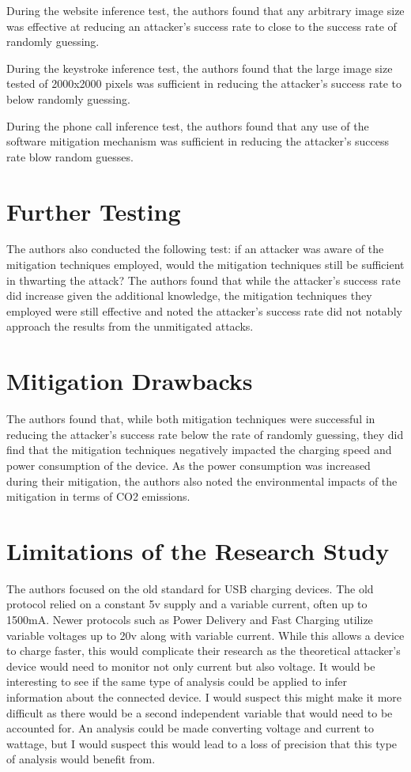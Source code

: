 During the website inference test, the authors found that any arbitrary image size was effective at reducing an attacker's success rate to close to the success rate of randomly guessing.

During the keystroke inference test, the authors found that the large image size tested of 2000x2000 pixels was sufficient in reducing the attacker's success rate to below randomly guessing.

During the phone call inference test, the authors found that any use of the software mitigation mechanism was sufficient in reducing the attacker's success rate blow random guesses.

\section{Further Testing}
The authors also conducted the following test: if an attacker was aware of the mitigation techniques employed, would the mitigation techniques still be sufficient in thwarting the attack? The authors found that while the attacker's success rate did increase given the additional knowledge, the mitigation techniques they employed were still effective and noted the attacker's success rate did not notably approach the results from the unmitigated attacks. 

\section{Mitigation Drawbacks}
\label{mitigation_drawbacks}
The authors found that, while both mitigation techniques were successful in reducing the attacker's success rate below the rate of randomly guessing, they did find that the mitigation techniques negatively impacted the charging speed and power consumption of the device. As the power consumption was increased during their mitigation, the authors also noted the environmental impacts of the mitigation in terms of CO2 emissions.

\section{Limitations of the Research Study}
\label{limitations_of_the_research_study}
The authors focused on the old standard for USB charging devices. The old protocol relied on a constant 5v supply and a variable current, often up to 1500mA. Newer protocols such as Power Delivery and Fast Charging utilize variable voltages up to 20v along with variable current. While this allows a device to charge faster, this would complicate their research as the theoretical attacker's device would need to monitor not only current but also voltage. It would be interesting to see if the same type of analysis could be applied to infer information about the connected device. I would suspect this might make it more difficult as there would be a second independent variable that would need to be accounted for. An analysis could be made converting voltage and current to wattage, but I would suspect this would lead to a loss of precision that this type of analysis would benefit from.

